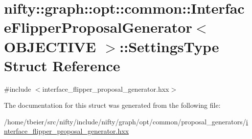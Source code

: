 \hypertarget{structnifty_1_1graph_1_1opt_1_1common_1_1InterfaceFlipperProposalGenerator_1_1SettingsType}{}\section{nifty\+:\+:graph\+:\+:opt\+:\+:common\+:\+:Interface\+Flipper\+Proposal\+Generator$<$ O\+B\+J\+E\+C\+T\+I\+VE $>$\+:\+:Settings\+Type Struct Reference}
\label{structnifty_1_1graph_1_1opt_1_1common_1_1InterfaceFlipperProposalGenerator_1_1SettingsType}


{\ttfamily \#include $<$interface\+\_\+flipper\+\_\+proposal\+\_\+generator.\+hxx$>$}



The documentation for this struct was generated from the following file\+:\begin{DoxyCompactItemize}
\item 
/home/tbeier/src/nifty/include/nifty/graph/opt/common/proposal\+\_\+generators/\hyperlink{interface__flipper__proposal__generator_8hxx}{interface\+\_\+flipper\+\_\+proposal\+\_\+generator.\+hxx}\end{DoxyCompactItemize}
